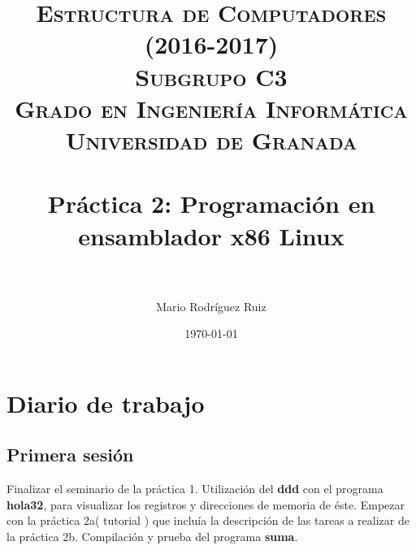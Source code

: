 


\title{	
\normalfont \normalsize 
\textsc{\textbf{Estructura de Computadores (2016-2017)} \\ Subgrupo C3 \\ Grado en Ingeniería Informática\\ Universidad de Granada} \\ [25pt] %
\horrule{0.5pt} \\[0.4cm] %
\huge Práctica 2: Programación en ensamblador x86 Linux \\ %
\horrule{2pt} \\[0.5cm] %
}

\author{Mario Rodríguez Ruiz} %

\date{\normalsize\today} %




\maketitle %

\newpage %

\tableofcontents %

\listoffigures

\newpage

\section{Diario de trabajo}
\subsection {Primera sesión}
Finalizar el seminario de la práctica 1. 
Utilización del \textbf{ddd} con el programa \textbf{hola32}, para visualizar los registros y direcciones de memoria de éste.
Empezar con la práctica 2a( tutorial ) que incluía la descripción de las tareas a realizar de la práctica 2b.
Compilación y prueba del programa \textbf{suma}.

